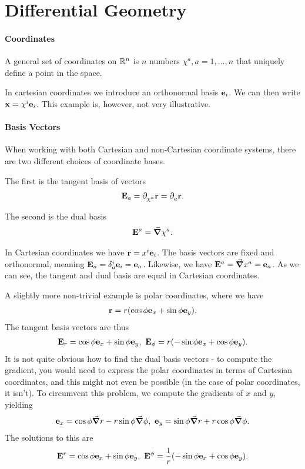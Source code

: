 \section{Differential Geometry}

\paragraph{Coordinates}
A general set of coordinates on $\mathbb{R}^{n}$ is $n$ numbers $\chi^{a}, a = 1, \dots, n$ that uniquely define a point in the space.

In cartesian coordinates we introduce an orthonormal basis $\vb{e}_{i}$. We can then write $\vb{x} = \chi^{i}\vb{e}_{i}$. This example is, however, not very illustrative.

\paragraph{Basis Vectors}
When working with both Cartesian and non-Cartesian coordinate systems, there are two different choices of coordinate bases.

The first is the tangent basis of vectors
\begin{align*}
	\vb{E}_{a} = \partial^{}_{\chi^{a}}\vb{r} = \partial^{}_{a}\vb{r}.
\end{align*}

The second is the dual basis
\begin{align*}
	\vb{E}^{a} = \grad{\chi^{a}}.
\end{align*}

In Cartesian coordinates we have $\vb{r} = x^{i}\vb{e}_{i}$. The basis vectors are fixed and orthonormal, meaning $\vb{E}_{a} = \delta_{a}^{i}\vb{e}_{i} = \vb{e}_{a}$. Likewise, we have $\vb{E}^{a} = \grad{x^{a}} = \vb{e}_{a}$. As we can see, the tangent and dual basis are equal in Cartesian coordinates.

A slightly more non-trivial example is polar coordinates, where we have
\begin{align*}
	\vb{r} = r(\cos{\phi}\vb{e}_{x} + \sin{\phi}\vb{e}_{y}).
\end{align*}
The tangent basis vectors are thus
\begin{align*}
	\vb{E}_{r} = \cos{\phi}\vb{e}_{x} + \sin{\phi}\vb{e}_{y},\ \vb{E}_{\phi} = r(-\sin{\phi}\vb{e}_{x} + \cos{\phi}\vb{e}_{y}).
\end{align*}
It is not quite obvious how to find the dual basis vectors - to compute the gradient, you would need to express the polar coordinates in terms of Cartesian coordinates, and this might not even be possible (in the case of polar coordinates, it isn't). To circumvent this problem, we compute the gradients of $x$ and $y$, yielding
\begin{align*}
	\vb{e}_{x} = \cos{\phi}\grad{r} - r\sin{\phi}\grad{\phi},\ \vb{e}_{y} = \sin{\phi}\grad{r} + r\cos{\phi}\grad{\phi}.
\end{align*}
The solutions to this are
\begin{align*}
	\vb{E}^{r} = \cos{\phi}\vb{e}_{x} + \sin{\phi}\vb{e}_{y},\ \vb{E}^{\phi} = \frac{1}{r}(-\sin{\phi}\vb{e}_{x} + \cos{\phi}\vb{e}_{y}).
\end{align*}

